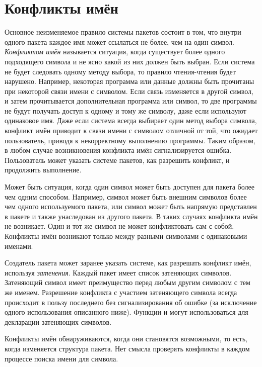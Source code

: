 \section{Конфликты имён}
\label{NAME-CONFLICTS-SECTION}

Основное неизменяемое правило системы пакетов состоит в том, что внутри одного
пакета каждое имя может ссылаться не более, чем на один символ.
\emph{Конфликтом имён} называется ситуация, когда существует более одного
подходящего символа и не ясно какой из них должен быть выбран. Если система не
будет следовать одному методу выбора, то правило чтения-чтения будет
нарушено. Например, некоторая программа или данные должны быть прочитаны при
некоторой связи имени с символом. Если связь изменяется в другой
символ, и затем прочитывается дополнительная программа или символ, то две
программы не будут получать доступ к одному и тому же символу, даже если
используют одинаковое имя. Даже если система всегда выбирает один метод выбора
символа, конфликт имён приводит к связи имени с символом отличной от той,
что ожидает пользователь, приводя к некорректному выполнению программы. Таким
образом, в любом случае возникновения конфликта имён сигнализируется
ошибка. Пользователь может указать системе пакетов, как разрешить конфликт, и
продолжить выполнение.

Может быть ситуация, когда один символ может быть доступен для пакета более чем
одним способом. Например, символ может быть внешним символов более чем одного
используемого пакета, или символ может быть напрямую представлен в пакете и
также унаследован из другого пакета.
В таких случаях конфликта имён не возникает.
Один и тот же символ не может конфликтовать сам с собой.
Конфликты имён возникают только между разными символами с одинаковыми именами.

Создатель пакета может заранее указать системе, как разрешать конфликт имён,
используя \emph{затенения}. Каждый пакет имеет список затеняющих
символов. Затеняющий символ имеет преимущество перед любым другим символом с тем
же именем. Разрешение конфликта с участием
затеняющего символа всегда происходит в пользу последнего без сигнализирования об
ошибке (за исключение одного использования  описанного
ниже). Функции  и  могут использоваться для
декларации затеняющих символов.

Конфликты имён обнаруживаются, когда они становятся возможными, то есть, когда
изменяется структура пакета. Нет смысла проверять конфликты в каждом процессе
поиска имени для символа.

